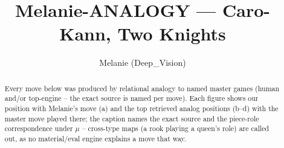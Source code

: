 \documentclass[11pt]{article}
\title{Melanie-ANALOGY — Caro-Kann, Two Knights}
\author{Melanie (Deep\_Vision)}
\date{}
\begin{document}
\maketitle

\begin{abstract}Every move below was produced by relational analogy to named master games (human and/or top-engine -- the exact source is named per move). Each figure shows our position with Melanie's move (a) and the top retrieved analog positions (b--d) with the master move played there; the caption names the exact source and the piece-role correspondence under $\mu$ -- cross-type maps (a rook playing a queen's role) are called out, as no material/eval engine explains a move that way.\end{abstract}

\begin{figure}[p]\centering
\begin{subfigure}{0.46\textwidth}\centering
\resizebox{\linewidth}{!}{%
\newchessgame
\chessboard[
  setfen={rn1qkb1r/pp3ppp/2p1pn2/3P4/3P4/2N2Q1P/PPP2PP1/R1B1KB1R b KQkq - 0 7},
  showmover=false,
  pgfstyle=straightmove, color=movearrow, markmove={c6-d5}
]}
\caption{}
\end{subfigure}\hfill
\begin{subfigure}{0.46\textwidth}\centering
\resizebox{\linewidth}{!}{%
\newchessgame
\chessboard[
  setfen={rn1qkb1r/pp2pppp/2p2n2/3P4/8/2N2Q1P/PPPP1PP1/R1B1KB1R b KQkq - 0 6},
  showmover=false,
  pgfstyle=straightmove, color=movearrow, markmove={c6-d5}
]}
\caption{}
\end{subfigure}
\\[4pt]
\begin{subfigure}{0.46\textwidth}\centering
\resizebox{\linewidth}{!}{%
\newchessgame
\chessboard[
  setfen={rn1qkb1r/pp2pppp/2p2n2/3P4/8/2N2Q1P/PPPP1PP1/R1B1KB1R b KQkq - 0 6},
  showmover=false,
  pgfstyle=straightmove, color=movearrow, markmove={c6-d5}
]}
\caption{}
\end{subfigure}\hfill
\begin{subfigure}{0.46\textwidth}\centering
\resizebox{\linewidth}{!}{%
\newchessgame
\chessboard[
  setfen={rn1qkb1r/pp2pppp/2p2n2/3P4/8/2N2Q1P/PPPP1PP1/R1B1KB1R b KQkq - 0 6},
  showmover=false,
  pgfstyle=straightmove, color=movearrow, markmove={c6-d5}
]}
\caption{}
\end{subfigure}

\end{figure}
\end{document}
